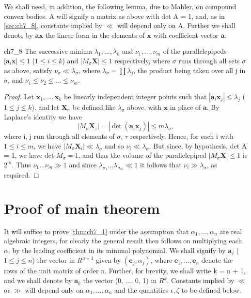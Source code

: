 We shall need, in addition, the following lemma, due to Mahler, on compound convex bodies. A will signify a matrix as above with det A = 1, and, as in \autoref{sec:ch7_8}, constants implied by $\ll$ will depend only on A. Further we shall denote by $\mathbf{a}\mathbf{x}$ the linear form in the elements of $\mathbf{x}$ with coefficient vector $\mathbf{a}$.

\begin{mylemma}{}{ch7_8}
The successive minima $\lambda_1, \dots, \lambda_k$ and $\nu_1, \dots, \nu_m$ of the parallelepipeds $|\mathbf{a}_i \mathbf{x}| \le 1$ ($1 \le i \le k$) and $|M_\sigma \mathbf{X}| \le 1$ respectively, where $\sigma$ runs through all sets $\sigma$ as above, satisfy $\nu_\sigma \ll \lambda_\sigma$, where $\lambda_\sigma = \prod \lambda_j$, the product being taken over all j in $\sigma$, and $\nu_1 \le \nu_2 \le \dots \le \nu_m$.
\end{mylemma}

\begin{proof}
Let $\mathbf{x}_1, \dots, \mathbf{x}_k$ be linearly independent integer points such that $|\mathbf{a}_i \mathbf{x}_j| \le \lambda_j$ ($1 \le j \le k$), and let $\mathbf{X}_\sigma$ be defined like $\lambda_\sigma$ above, with $\mathbf{x}$ in place of $\mathbf{a}$. By Laplace's identity we have
\[|M_\sigma \mathbf{X}_\tau| = |\operatorname{det}(\mathbf{a}_i \mathbf{x}_j)| \leqslant m \lambda_\sigma,\]
where i, j run through all elements of $\sigma$, $\tau$ respectively. Hence, for each i with $1 \leqslant i \leqslant m$, we have $|M_\sigma \mathbf{X}_i| \ll \lambda_\sigma$ and so $\nu_i \ll \lambda_\sigma$. But since, by hypothesis, det A = 1, we have det $M_\sigma = 1$, and thus the volume of the parallelepiped $|M_\sigma \mathbf{X}| \leqslant 1$ is $2^m$. Thus $\nu_1 \dots \nu_m \gg 1$ and since $\lambda_{\sigma_1} \dots \lambda_{\sigma_m} \ll 1$ it follows that $\nu_i \gg \lambda_\sigma$, as required.
\end{proof}

\section{Proof of main theorem}\label{sec:ch7_10}

It will suffice to prove \autoref{thm:ch7_1} under the assumption that $\alpha_1, \dots, \alpha_n$ are real algebraic integers, for clearly the general result then follows on multiplying each $\alpha_i$ by the leading coefficient in its minimal polynomial. We shall signify by $\mathbf{a}_j$ ($1 \leqslant j \leqslant n$) the vector in $R^{n+1}$ given by $(\mathbf{e}_j, \alpha_j)$, where $\mathbf{e}_1, \dots, \mathbf{e}_n$ denote the rows of the unit matrix of order n. Further, for brevity, we shall write k = n + 1, and we shall denote by $\mathbf{a}_k$ the vector (0, ..., 0, 1) in $R^k$. Constants implied by $\ll$ or $\gg$ will depend only on $\alpha_1, \dots, \alpha_n$ and the quantities $\epsilon, \zeta$ to be defined below.

